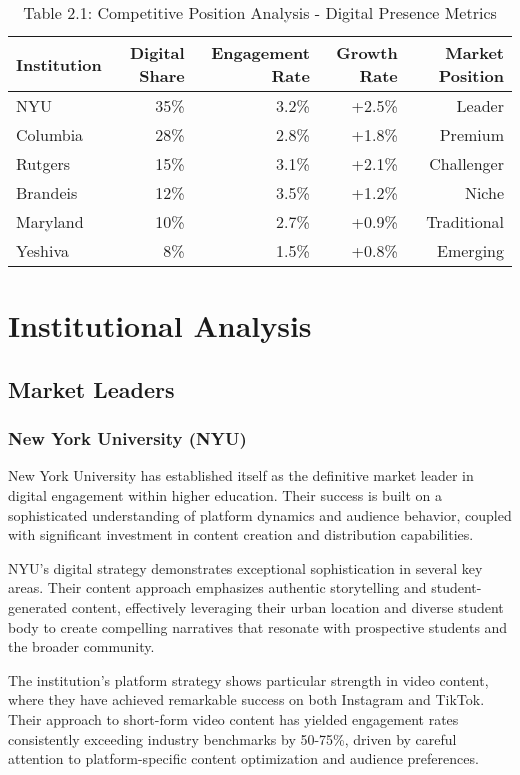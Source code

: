 \documentclass[12pt]{report}
\begin{document}
\begin{table}[h]
\centering
\caption{Table 2.1: Competitive Position Analysis - Digital Presence Metrics}
\begin{tabular}{@{}lrrrr@{}}
\toprule
\textbf{Institution} & \textbf{Digital Share} & \textbf{Engagement Rate} & \textbf{Growth Rate} & \textbf{Market Position} \\
\midrule
NYU & 35\% & 3.2\% & +2.5\% & Leader \\
Columbia & 28\% & 2.8\% & +1.8\% & Premium \\
Rutgers & 15\% & 3.1\% & +2.1\% & Challenger \\
Brandeis & 12\% & 3.5\% & +1.2\% & Niche \\
Maryland & 10\% & 2.7\% & +0.9\% & Traditional \\
Yeshiva & 8\% & 1.5\% & +0.8\% & Emerging \\
\bottomrule
\end{tabular}
\end{table}

\chapter{Institutional Analysis}

\section{Market Leaders}

\subsection{New York University (NYU)}

New York University has established itself as the definitive market leader in digital engagement within higher education. Their success is built on a sophisticated understanding of platform dynamics and audience behavior, coupled with significant investment in content creation and distribution capabilities.

NYU's digital strategy demonstrates exceptional sophistication in several key areas. Their content approach emphasizes authentic storytelling and student-generated content, effectively leveraging their urban location and diverse student body to create compelling narratives that resonate with prospective students and the broader community.

The institution's platform strategy shows particular strength in video content, where they have achieved remarkable success on both Instagram and TikTok. Their approach to short-form video content has yielded engagement rates consistently exceeding industry benchmarks by 50-75\%, driven by careful attention to platform-specific content optimization and audience preferences.
\end{document}
